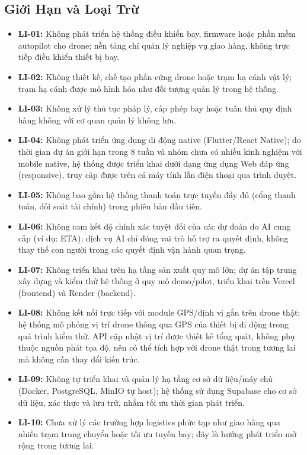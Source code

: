 \subsection{Giới Hạn và Loại Trừ}

\begin{itemize}
  \item \textbf{LI-01:} Không phát triển hệ thống điều khiển bay, firmware hoặc phần mềm autopilot cho drone; nền tảng chỉ quản lý nghiệp vụ giao hàng, không trực tiếp điều khiển thiết bị bay.
  \item \textbf{LI-02:} Không thiết kế, chế tạo phần cứng drone hoặc trạm hạ cánh vật lý; trạm hạ cánh được mô hình hóa như đối tượng quản lý trong hệ thống.
  \item \textbf{LI-03:} Không xử lý thủ tục pháp lý, cấp phép bay hoặc tuân thủ quy định hàng không với cơ quan quản lý không lưu.
  \item \textbf{LI-04:} Không phát triển ứng dụng di động native (Flutter/React Native); do thời gian dự án giới hạn trong 8 tuần và nhóm chưa có nhiều kinh nghiệm với mobile native, hệ thống được triển khai dưới dạng ứng dụng Web đáp ứng (responsive), truy cập được trên cả máy tính lẫn điện thoại qua trình duyệt.
  \item \textbf{LI-05:} Không bao gồm hệ thống thanh toán trực tuyến đầy đủ (cổng thanh toán, đối soát tài chính) trong phiên bản đầu tiên.
  \item \textbf{LI-06:} Không cam kết độ chính xác tuyệt đối của các dự đoán do AI cung cấp (ví dụ: ETA); dịch vụ AI chỉ đóng vai trò hỗ trợ ra quyết định, không thay thế con người trong các quyết định vận hành quan trọng.
  \item \textbf{LI-07:} Không triển khai trên hạ tầng sản xuất quy mô lớn; dự án tập trung xây dựng và kiểm thử hệ thống ở quy mô demo/pilot, triển khai trên Vercel (frontend) và Render (backend).
  \item \textbf{LI-08:} Không kết nối trực tiếp với module GPS/định vị gắn trên drone thật; hệ thống mô phỏng vị trí drone thông qua GPS của thiết bị di động trong quá trình kiểm thử. API cập nhật vị trí được thiết kế tổng quát, không phụ thuộc nguồn phát tọa độ, nên có thể tích hợp với drone thật trong tương lai mà không cần thay đổi kiến trúc.
  \item \textbf{LI-09:} Không tự triển khai và quản lý hạ tầng cơ sở dữ liệu/máy chủ (Docker, PostgreSQL, MinIO tự host); hệ thống sử dụng Supabase cho cơ sở dữ liệu, xác thực và lưu trữ, nhằm tối ưu thời gian phát triển.
  \item \textbf{LI-10:} Chưa xử lý các trường hợp logistics phức tạp như giao hàng qua nhiều trạm trung chuyển hoặc tối ưu tuyến bay; đây là hướng phát triển mở rộng trong tương lai.
\end{itemize}